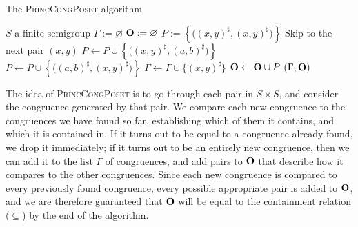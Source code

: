 \begin{algorithm}
  \caption{The \textsc{PrincCongPoset} algorithm}
  \label{alg:princ-cong-poset}
  \begin{algorithmic}[1]
    \Require $S$ a finite semigroup
      \State $\Gamma := \varnothing$
      \State $\mathbf{O} := \varnothing$
        \State $P := \left\{\big((x,y)^\sharp, (x,y)^\sharp\big)\right\}$
              \State Skip to the next pair $(x,y)$
            \Else
              \State $P \gets P \cup
                \left\{\big((x,y)^\sharp, (a,b)^\sharp\big)\right\}$
            \EndIf
              \State $P \gets P \cup
                \left\{\big((a,b)^\sharp, (x,y)^\sharp\big)\right\}$
          \EndIf
        \EndFor
        \State $\Gamma \gets \Gamma \cup \{(x,y)^\sharp\}$
        \State $\mathbf{O} \gets \mathbf{O} \cup P$
      \EndFor
      \State \Return $(\Gamma, \mathbf{O})$
    \EndProcedure
  \end{algorithmic}
\end{algorithm}

The idea of \textsc{PrincCongPoset} is to go through each pair in $S \times S$,
and consider the congruence generated by that pair.  We compare each new
congruence to the congruences we have found so far, establishing which of them
it contains, and which it is contained in.  If it turns out to be equal to a
congruence already found, we drop it immediately; if it turns out to be an
entirely new congruence, then we can add it to the list $\Gamma$ of congruences,
and add pairs to $\mathbf{O}$ that describe how it compares to the other congruences.
Since each new congruence is compared to every previously found congruence,
every possible appropriate pair is added to $\mathbf{O}$, and we are therefore
guaranteed that $\mathbf{O}$ will be equal to the containment relation ($\subseteq$) by
the end of the algorithm.

